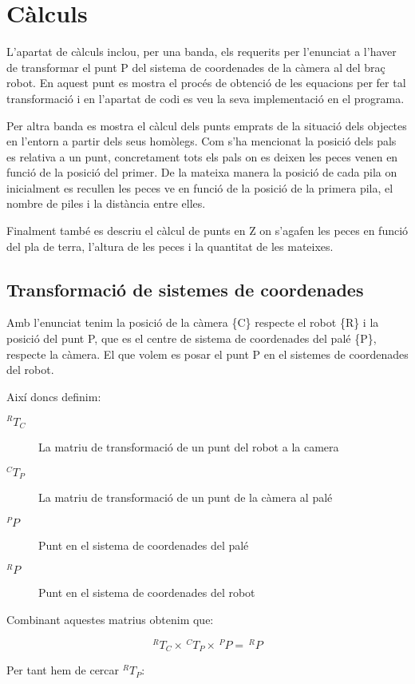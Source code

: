 \section{Càlculs}
L'apartat de càlculs inclou, per una banda, els requerits per l'enunciat a
l'haver de transformar el punt P del sistema de coordenades de la càmera al del
braç robot. En aquest punt es mostra el procés de obtenció de les equacions per
fer tal transformació i en l'apartat de codi es veu la seva implementació en el
programa.

Per altra banda es mostra el càlcul dels punts emprats de la situació dels
objectes en l'entorn a partir dels seus homòlegs. Com s'ha mencionat la posició
dels pals es relativa a un punt, concretament tots els pals on es deixen les
peces venen en funció de la posició del primer.
De la mateixa manera la posició de cada pila on inicialment es recullen les
peces ve en funció de la posició de la primera pila, el nombre de piles i la
distància entre elles.

Finalment també es descriu el càlcul de punts en Z on s'agafen les peces en
funció del pla de terra, l'altura de les peces i la quantitat de les mateixes.

\subsection{Transformació de sistemes de coordenades}
Amb l'enunciat tenim la posició de la càmera \{C\} respecte el robot \{R\} i
la posició del punt P, que es el centre de sistema de coordenades del palé
\{P\}, respecte la càmera. El que volem es posar el punt P en el sistemes de
coordenades del robot.

Així doncs definim:

\begin{description}
\item[$^RT_C$] La matriu de transformació de un punt del robot a la camera
\item[$^CT_P$] La matriu de transformació de un punt de la càmera al palé
\item[$^PP$] Punt en el sistema de coordenades del palé
\item[$^RP$] Punt en el sistema de coordenades del robot
\end{description}

Combinant aquestes matrius obtenim que:

$$ ^RT_C \times \,^CT_P \times \,^PP = \,^RP $$

Per tant hem de cercar $^RT_P$:

